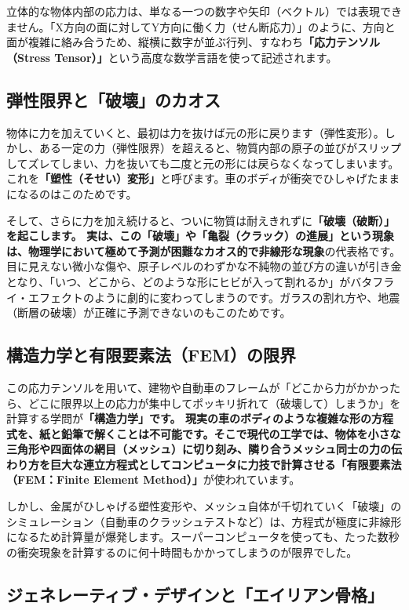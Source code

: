 立体的な物体内部の応力は、単なる一つの数字や矢印（ベクトル）では表現できません。「X方向の面に対してY方向に働く力（せん断応力）」のように、方向と面が複雑に絡み合うため、縦横に数字が並ぶ行列、すなわち\textbf{「応力テンソル（Stress Tensor）」}という高度な数学言語を使って記述されます。

\subsection{弾性限界と「破壊」のカオス}

物体に力を加えていくと、最初は力を抜けば元の形に戻ります（弾性変形）。しかし、ある一定の力（弾性限界）を超えると、物質内部の原子の並びがスリップしてズレてしまい、力を抜いても二度と元の形には戻らなくなってしまいます。これを\textbf{「塑性（そせい）変形」}と呼びます。車のボディが衝突でひしゃげたままになるのはこのためです。

そして、さらに力を加え続けると、ついに物質は耐えきれずに\textbf{「破壊（破断）」を起こします。 実は、この「破壊」や「亀裂（クラック）の進展」という現象は、物理学において極めて予測が困難なカオス的で非線形な現象}の代表格です。 目に見えない微小な傷や、原子レベルのわずかな不純物の並び方の違いが引き金となり、「いつ、どこから、どのような形にヒビが入って割れるか」がバタフライ・エフェクトのように劇的に変わってしまうのです。ガラスの割れ方や、地震（断層の破壊）が正確に予測できないのもこのためです。

\subsection{構造力学と有限要素法（FEM）の限界}

この応力テンソルを用いて、建物や自動車のフレームが「どこから力がかかったら、どこに限界以上の応力が集中してポッキリ折れて（破壊して）しまうか」を計算する学問が\textbf{「構造力学」です。 現実の車のボディのような複雑な形の方程式を、紙と鉛筆で解くことは不可能です。そこで現代の工学では、物体を小さな三角形や四面体の網目（メッシュ）に切り刻み、隣り合うメッシュ同士の力の伝わり方を巨大な連立方程式としてコンピュータに力技で計算させる「有限要素法（FEM：Finite Element Method）」}が使われています。

しかし、金属がひしゃげる塑性変形や、メッシュ自体が千切れていく「破壊」のシミュレーション（自動車のクラッシュテストなど）は、方程式が極度に非線形になるため計算量が爆発します。スーパーコンピュータを使っても、たった数秒の衝突現象を計算するのに何十時間もかかってしまうのが限界でした。

\subsection{ジェネレーティブ・デザインと「エイリアン骨格」}

